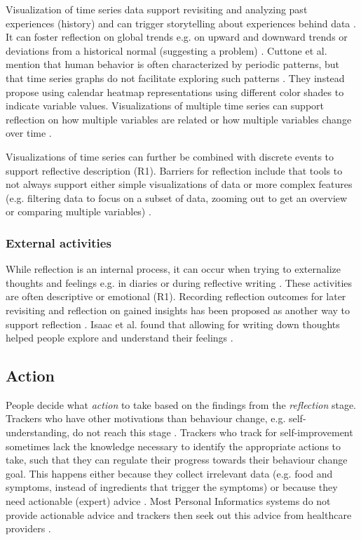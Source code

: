 Visualization of time series data support revisiting and analyzing past experiences (history) and can trigger storytelling about experiences behind data \cite{Rivera, Muller}. It can foster reflection on global trends e.g. on upward and downward trends or deviations from a historical normal (suggesting a problem) \cite{Rivera}. Cuttone et al. mention that human behavior is often characterized by periodic patterns, but that time series graphs do not facilitate exploring such patterns \cite{Cuttone}. They instead propose using calendar heatmap representations using different color shades to indicate variable values. Visualizations of multiple time series can support reflection on how multiple variables are related or how multiple variables change over time \cite{Cuttone}. 

Visualizations of time series can further be combined with discrete events \cite{Sorensen} to support reflective description (R1). Barriers for reflection include that tools to not always support either simple visualizations of data or more complex features (e.g. filtering data to focus on a subset of data, zooming out to get an overview or comparing multiple variables) \cite{Li2011, MacLeod2014}. 

\subsubsection{External activities}
While reflection is an internal process, it can occur when trying to externalize thoughts and feelings e.g. in diaries or during reflective writing \cite{Mols}. These activities are often descriptive or emotional (R1). Recording reflection outcomes for later revisiting and reflection on gained insights has been proposed as another way to support reflection \cite{Isaac, Muller}. Isaac et al. found that allowing for writing down thoughts helped people explore and understand their feelings \cite{Isaac}. 

\subsection{Action} 
People decide what \textit{action} to take based on the findings from the \textit{reflection} stage. Trackers who have other motivations than behaviour change, e.g. self-understanding, do not reach this stage \cite{Epstein2015}. Trackers who track for self-improvement sometimes lack the knowledge necessary to identify the appropriate actions to take, such that they can regulate their progress towards their behaviour change goal. This happens either because they collect irrelevant data \cite{Choe2014, Chung2015} (e.g. food and symptoms, instead of ingredients that trigger the symptoms) or because they need actionable (expert) advice \cite{Verdezoto2015, Li2010, Oh2015}. Most Personal Informatics systems do not provide actionable advice \cite{Chung2015, Li2010, Verdezoto2015} and trackers then seek out this advice from healthcare providers \cite{Li2010}.

